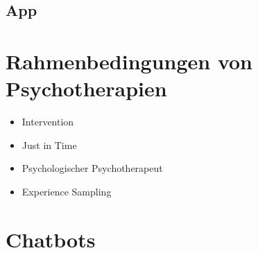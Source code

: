 \subsection{App}



\section{Rahmenbedingungen von Psychotherapien}

\begin{itemize}
\item Intervention
\item Just in Time
\item Psychologischer Psychotherapeut
\item Experience Sampling
\end{itemize}

\section{Chatbots}

